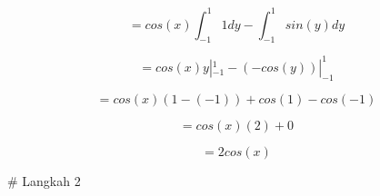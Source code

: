 \documentclass[a4paper,10pt]{article}
\begin{document}
\begin{eulernotebook}
\begin{eulercomment}
\begin{eulercomment}
\begin{eulercomment}
\begin{eulercomment}
\begin{eulercomment}
\begin{eulercomment}
\begin{eulercomment}
\begin{eulercomment}
\begin{eulercomment}
\begin{eulercomment}
\begin{eulercomment}
\begin{eulercomment}
\begin{eulercomment}
\begin{eulercomment}
\begin{eulercomment}
\end{eulercomment}
\begin{eulerformula}
\[
= cos(x) \int_{-1}^1 1 dy - \int_{-1}^1 sin(y) dy
\]
\end{eulerformula}
\begin{eulercomment}
\end{eulercomment}
\begin{eulerformula}
\[
= cos(x) y|_{-1}^1 - (- cos(y))|_{-1}^1
\]
\end{eulerformula}
\begin{eulercomment}
\end{eulercomment}
\begin{eulerformula}
\[
= cos(x) (1 - (-1)) + cos(1) - cos(-1)
\]
\end{eulerformula}
\begin{eulercomment}
\end{eulercomment}
\begin{eulerformula}
\[
= cos(x)(2) + 0
\]
\end{eulerformula}
\begin{eulercomment}
\end{eulercomment}
\begin{eulerformula}
\[
= 2cos(x)
\]
\end{eulerformula}
\begin{eulercomment}
# Langkah 2


\end{eulercomment}
\end{eulercomment}
\end{eulercomment}
\end{eulercomment}
\end{eulercomment}
\end{eulercomment}
\end{eulercomment}
\end{eulercomment}
\end{eulercomment}
\end{eulercomment}
\end{eulercomment}
\end{eulercomment}
\end{eulercomment}
\end{eulercomment}
\end{eulercomment}
\end{eulernotebook}
\end{document}
